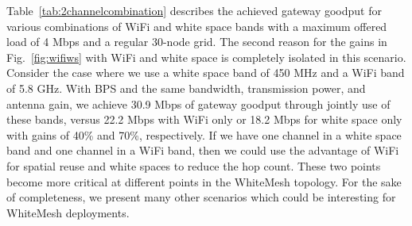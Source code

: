 Table~\ref{tab:2channelcombination} describes the achieved gateway goodput for various
combinations of WiFi and white space bands with a maximum offered load of 4 Mbps and
a regular 30-node grid. The second reason for the gains in Fig.~\ref{fig:wifiws} 
with WiFi and white space is completely isolated in this scenario. Consider the case where we use a white space band of 450 MHz 
and a WiFi band of 5.8 GHz.  
With BPS and the same bandwidth, transmission power, and antenna gain, we achieve 
30.9 Mbps of gateway goodput through jointly use of these bands, 
versus 22.2 Mbps with WiFi only or 18.2 Mbps for white space only with gains of 
40\% and 70\%, respectively. If we have one channel in a white space band and one 
channel in a WiFi band, then we could use the advantage of WiFi for spatial reuse
and white spaces to reduce the hop count. These two points become more critical at
different points in the WhiteMesh topology. For the sake of completeness, we present
many other scenarios which could be interesting for WhiteMesh deployments.





